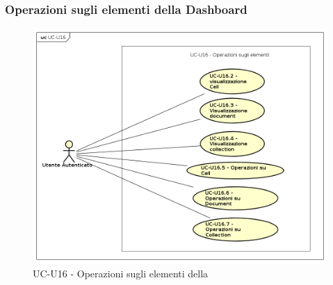 \subsubsection{Operazioni sugli elementi della Dashboard}

    \begin{figure}[H]
      \begin{center}
        \includegraphics[width=12cm]{res/img/UCUtenti/UCUtenteA/UC-U16-Operazioni_sulle_righe/UC-U16.png}
      \caption{UC-U16 - Operazioni sugli elementi della }
      \end{center} 
    \end{figure}


